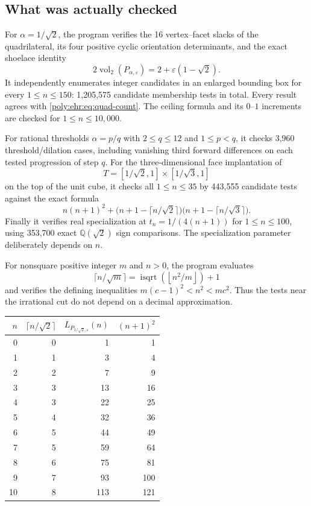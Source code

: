 \documentclass[11pt,a4paper]{article}
\numberwithin{equation}{section}
\theoremstyle{plain}
\newcommand{\Q}{\mathbb Q}
\newcommand{\eps}{\varepsilon}
\newcommand{\vol}{\operatorname{vol}}
\newcommand{\floor}[1]{\left\lfloor #1\right\rfloor}
\begin{document}
\subsection{What was actually checked}

For $\alpha=1/\sqrt2$, the program verifies the 16 vertex--facet slacks of
the quadrilateral, its four positive cyclic orientation determinants, and
the exact shoelace identity
\[
 2\vol_2(P_{\alpha,\eps})=2+\eps(1-\sqrt2).
\]
It independently enumerates integer candidates in an enlarged bounding box
for every $1\leq n\leq150$: 1,205,575 candidate membership tests in total.
Every result agrees with \eqref{poly:ehr:eq:quad-count}. The ceiling formula and
its $0$--$1$ increments are checked for $1\leq n\leq10{,}000$.

For rational thresholds $\alpha=p/q$ with $2\leq q\leq12$ and
$1\leq p<q$, it checks 3,960 threshold/dilation cases, including vanishing
third forward differences on each tested progression of step $q$.
For the three-dimensional face implantation of
\[
 T=[1/\sqrt2,1]\times[1/\sqrt3,1]
\]
on the top of the unit cube, it checks all $1\leq n\leq35$ by 443,555
candidate tests against the exact formula
\[
 n(n+1)^2+
 \bigl(n+1-\lceil n/\sqrt2\rceil\bigr)
 \bigl(n+1-\lceil n/\sqrt3\rceil\bigr).
\]
Finally it verifies real specialization at
$t_n=1/(4(n+1))$ for $1\leq n\leq100$, using 353,700 exact
$\Q(\sqrt2)$ sign comparisons. The specialization parameter deliberately
depends on $n$.

For nonsquare positive integer $m$ and $n>0$, the program evaluates
\[
 \lceil n/\sqrt m\rceil=\operatorname{isqrt}(\floor{n^2/m})+1
\]
and verifies the defining inequalities
$m(c-1)^2<n^2<mc^2$. Thus the tests near the irrational cut do not depend
on a decimal approximation.

\begin{center}
\begin{tabular}{rrrr}
\toprule
$n$ & $\lceil n/\sqrt2\rceil$ & $L_{P_{1/\sqrt2,\eps}}(n)$ & $(n+1)^2$\\
\midrule
0&0&1&1\\
1&1&3&4\\
2&2&7&9\\
3&3&13&16\\
4&3&22&25\\
5&4&32&36\\
6&5&44&49\\
7&5&59&64\\
8&6&75&81\\
9&7&93&100\\
10&8&113&121\\
\bottomrule
\end{tabular}
\end{center}
\end{document}
